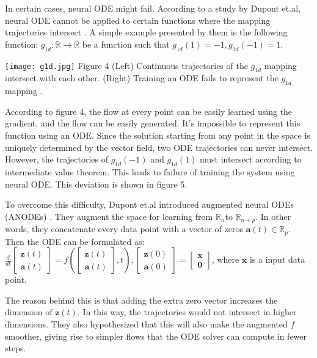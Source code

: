 \documentclass{article}
\begin{document}
In certain cases, neural ODE might fail. According to a study by Dupont et.al, neural ODE cannot be applied to certain functions where the mapping trajectories intersect \cite{dupont2019augmented}. A simple example presented by them is the following function:  
$g_{1d}: \mathbb{R} \rightarrow \mathbb{R}$ be a function such that $g_{1d}(1) = -1, g_{1d}(-1) = 1$.
 
\begin{center}
    \texttt{[image: g1d.jpg]}
    Figure 4 (Left) Continuous trajectories of the $g_{1d}$ mapping intersect with each other. (Right) Training an ODE fails to represent the $g_{1d}$ mapping \cite{dupont2019augmented}.
\end{center}

According to figure 4, the flow at every point can be easily learned using the gradient, and the flow can be easily generated. It’s impossible to represent this function using an ODE. Since the solution starting from any point in the space is uniquely determined by the vector field, two ODE trajectories can never intersect. However, the trajectories of $g_{1d}(-1)$ and $g_{1d}(1)$ must intersect according to intermediate value theorem. This leads to failure of training the system using neural ODE. This deviation is shown in figure 5.

To overcome this difficulty, Dupont et.al introduced augmented neural ODEs (ANODEs) \cite{dupont2019augmented}. They augment the space for learning from $\mathbb{R}_n$to $\mathbb{R}_{n+p}$. In other words, they concatenate every data point with a vector of zeros $\mathbf{a}(t)\in \mathbb{R}_p$. Then the ODE can be formulated as:  
$\frac{d}{dt}
\begin{bmatrix}
\mathbf{z}(t) \\
\mathbf{a}(t)
\end{bmatrix} = f(\begin{bmatrix}
\mathbf{z}(t) \\
\mathbf{a}(t)
\end{bmatrix} , t), \begin{bmatrix}
\mathbf{z}(0) \\
\mathbf{a}(0)
\end{bmatrix} = \begin{bmatrix}
\mathbf{x} \\
\mathbf{0}
\end{bmatrix}
$, where $\mathbf{x}$ is a input data point.

The reason behind this is that adding the extra zero vector increases the dimension of $\mathbf{z}(t)$. In this way, the trajectories would not intersect in higher dimensions. They also hypothesized that this will also make the augmented $f$ smoother, giving rise to simpler flows that the ODE solver can compute in fewer steps.
\end{document}
